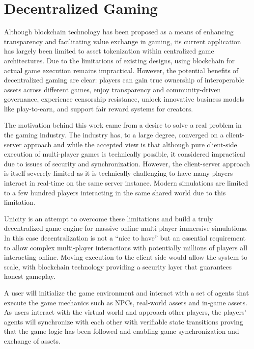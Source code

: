 \documentclass{article}
\begin{document}
\section{Decentralized Gaming}

Although blockchain technology has been proposed as a means of enhancing transparency and facilitating value exchange in gaming, its current application has largely been limited to asset tokenization within centralized game architectures. Due to the limitations of existing designs, using blockchain for actual game execution remains impractical. However, the potential benefits of decentralized gaming are clear: players can gain true ownership of interoperable assets across different games, enjoy transparency and community-driven governance, experience censorship resistance, unlock innovative business models like play-to-earn, and support fair reward systems for creators.


The motivation behind this work came from a desire to solve a real problem in the gaming industry. The industry has, to a large degree, converged on a client-server approach and while the accepted view is that although pure client-side execution of multi-player games is technically possible, it considered impractical due to issues of security and synchronization. However, the client-server approach is itself severely limited as it is technically challenging to have many players interact in real-time on the same server instance. Modern simulations are limited to a few hundred players interacting in the same shared world due to this limitation.


Unicity is an attempt to overcome these limitations and build a truly decentralized game engine for massive online multi-player immersive simulations. In this case decentralization is not a “nice to have” but an essential requirement to allow complex multi-player interactions with potentially millions of players all interacting online. Moving execution to the client side would allow the system to scale, with blockchain technology providing a security layer that guarantees honest gameplay.


A user will initialize the game environment and interact with a set of agents that execute the game mechanics such as NPCs, real-world assets and in-game assets. As users interact with the virtual world and approach other players, the players' agents will synchronize with each other with verifiable state transitions proving that the game logic has been followed and enabling game synchronization and exchange of assets.
\end{document}
